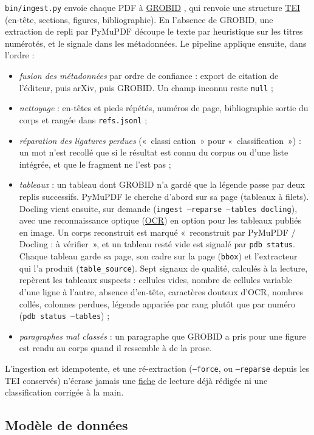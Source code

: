 \documentclass[11pt,a4paper]{article}
\newcommand{\cmd}[1]{\texttt{#1}}
\newcommand{\gl}[2]{\hyperlink{gl:#1}{\textcolor{glcolor}{#2}}}
\begin{document}
\cmd{bin/ingest.py} envoie chaque PDF à \gl{GROBID}{GROBID} \citep{grobid}, qui renvoie une structure
\gl{TEI}{TEI} (en-tête, sections, figures, bibliographie). En l'absence de GROBID, une extraction de
repli par PyMuPDF découpe le texte par heuristique sur les titres numérotés, et le signale
dans les métadonnées. Le pipeline applique ensuite, dans l'ordre :
\begin{itemize}
  \item \emph{fusion des métadonnées} par ordre de confiance : export de citation de
    l'éditeur, puis arXiv, puis GROBID. Un champ inconnu reste \cmd{null} ;
  \item \emph{nettoyage} : en-têtes et pieds répétés, numéros de page, bibliographie sortie
    du corps et rangée dans \cmd{refs.jsonl} ;
  \item \emph{réparation des ligatures perdues} («~classi cation~» pour
    «~classification~») : un mot n'est recollé que si le résultat est connu du corpus ou
    d'une liste intégrée, et que le fragment ne l'est pas ;
  \item \emph{tableaux} : un tableau dont GROBID n'a gardé que la légende passe par deux
    replis successifs. PyMuPDF le cherche d'abord sur sa page (tableaux à filets). Docling
    \citep{auer2024docling} vient ensuite, sur demande (\cmd{ingest --reparse --tables
    docling}), avec une reconnaissance optique (\gl{OCR}{OCR}) en option pour les tableaux publiés
    en image. Un corps reconstruit est marqué «~reconstruit par PyMuPDF / Docling : à
    vérifier~», et un tableau resté vide est signalé par \cmd{pdb status}. Chaque tableau
    garde sa page, son cadre sur la page (\cmd{bbox}) et l'extracteur qui l'a produit
    (\cmd{table\_source}). Sept signaux de qualité, calculés à la lecture, repèrent les
    tableaux suspects : cellules vides, nombre de cellules variable d'une ligne à l'autre,
    absence d'en-tête, caractères douteux d'OCR, nombres collés, colonnes perdues, légende
    appariée par rang plutôt que par numéro (\cmd{pdb status --tables}) ;
  \item \emph{paragraphes mal classés} : un paragraphe que GROBID a pris pour une figure est
    rendu au corps quand il ressemble à de la prose.
\end{itemize}
L'ingestion est idempotente, et une ré-extraction (\cmd{--force}, ou \cmd{--reparse}
depuis les TEI conservés) n'écrase jamais une \gl{fiche}{fiche} de lecture déjà rédigée ni une
classification corrigée à la main.

\subsection{Modèle de données}
\label{sec:data}
\end{document}
